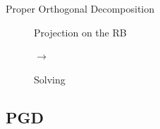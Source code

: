 \documentclass[12pt]{beamer}
\begin{document}
\begin{frame}{Proper Orthogonal Decomposition}
\begin{figure}
\begin{minipage}{0.19\linewidth}
\begin{alertblock}{}
				Projection on the RB
			\end{alertblock}
	   \end{minipage}\hfill
	   \begin{minipage}{0.03\linewidth}
			\vspace{0.220cm}
	   		$\!\!\rightarrow$
	   \end{minipage}\hfill
	   \begin{minipage}{0.19\linewidth}
			\begin{alertblock}{}
				\centering		
				\vspace{0.20cm}
				Solving
				\vspace{0.20cm}
			\end{alertblock}
	   \end{minipage}
	\end{figure}
		
\end{frame}

\subsection{PGD}
\end{document}
